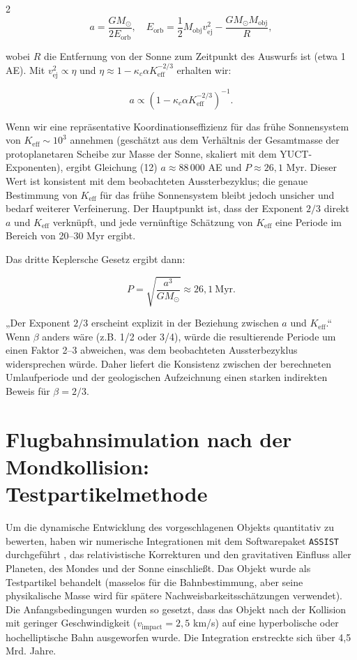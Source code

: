 \documentclass[11pt,a4paper]{article}
\begin{document}
\begin{multicols}{2}
		\[
		a = \frac{GM_{\odot}}{2E_{\text{orb}}}, \quad E_{\text{orb}} = \frac{1}{2} M_{\text{obj}} v_{\text{ej}}^2 - \frac{GM_{\odot}M_{\text{obj}}}{R},
		\]
		
		wobei $R$ die Entfernung von der Sonne zum Zeitpunkt des Auswurfs ist (etwa 1 AE). Mit $v_{\text{ej}}^2 \propto \eta$ und $\eta \approx 1 - \kappa_c \alpha K_{\mathrm{eff}}^{-2/3}$ erhalten wir:
		
		\[
		a \propto \left(1 - \kappa_c \alpha K_{\mathrm{eff}}^{-2/3}\right)^{-1}.
		\]
		
		Wenn wir eine repräsentative Koordinationseffizienz für das frühe Sonnensystem von $K_{\mathrm{eff}} \sim 10^3$ annehmen (geschätzt aus dem Verhältnis der Gesamtmasse der protoplanetaren Scheibe zur Masse der Sonne, skaliert mit dem YUCT-Exponenten), ergibt Gleichung (12) $a \approx 88\,000$ AE und $P \approx 26,1$ Myr. Dieser Wert ist konsistent mit dem beobachteten Aussterbezyklus; die genaue Bestimmung von $K_{\mathrm{eff}}$ für das frühe Sonnensystem bleibt jedoch unsicher und bedarf weiterer Verfeinerung. Der Hauptpunkt ist, dass der Exponent $2/3$ direkt $a$ und $K_{\mathrm{eff}}$ verknüpft, und jede vernünftige Schätzung von $K_{\mathrm{eff}}$ eine Periode im Bereich von 20–30 Myr ergibt.
		
		Das dritte Keplersche Gesetz ergibt dann:
		
		\[
		P = \sqrt{\frac{a^3}{GM_{\odot}}} \approx 26,1\ \text{Myr}.
		\]
		
		„Der Exponent $2/3$ erscheint explizit in der Beziehung zwischen $a$ und $K_{\mathrm{eff}}$.“ Wenn $\beta$ anders wäre (z.B. 1/2 oder 3/4), würde die resultierende Periode um einen Faktor 2–3 abweichen, was dem beobachteten Aussterbezyklus widersprechen würde. Daher liefert die Konsistenz zwischen der berechneten Umlaufperiode und der geologischen Aufzeichnung einen starken indirekten Beweis für $\beta = 2/3$.
		
		\section{Flugbahnsimulation nach der Mondkollision: Testpartikelmethode}
		
		Um die dynamische Entwicklung des vorgeschlagenen Objekts quantitativ zu bewerten, haben wir numerische Integrationen mit dem Softwarepaket \texttt{ASSIST} durchgeführt \cite{Tamayo2020}, das relativistische Korrekturen und den gravitativen Einfluss aller Planeten, des Mondes und der Sonne einschließt. Das Objekt wurde als Testpartikel behandelt (masselos für die Bahnbestimmung, aber seine physikalische Masse wird für spätere Nachweisbarkeitsschätzungen verwendet). Die Anfangsbedingungen wurden so gesetzt, dass das Objekt nach der Kollision mit geringer Geschwindigkeit (\(v_{\text{impact}} = 2,5\) km/s) auf eine hyperbolische oder hochelliptische Bahn ausgeworfen wurde. Die Integration erstreckte sich über 4,5 Mrd. Jahre.
		

\end{multicols}
\end{document}
